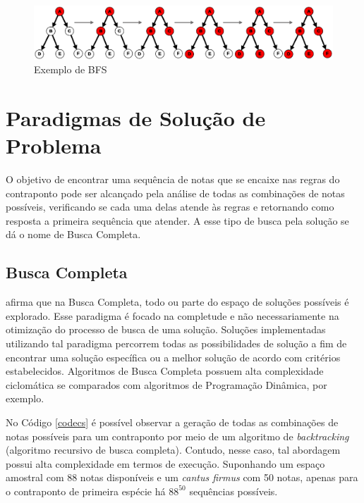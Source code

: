       \begin{figure}[htb]
        \centering
        \includegraphics[scale=0.2]{figuras/bfs.eps}
        \caption{Exemplo de BFS}
        \label{bfs}
      \end{figure}

  \section[Paradigmas de Solução de Problema]{Paradigmas de Solução de Problema}

    O objetivo de encontrar uma sequência de notas que se encaixe nas regras do contraponto pode ser alcançado pela análise de todas as combinações de notas possíveis, verificando se cada uma delas atende às regras e retornando como resposta a primeira sequência que atender. A esse tipo de busca pela solução se dá o nome de Busca Completa.

    \subsection[Busca Completa]{Busca Completa}

       afirma que na Busca Completa, todo ou parte do espaço de soluções possíveis é explorado. Esse paradigma é focado na completude e não necessariamente na otimização do processo de busca de uma solução. Soluções implementadas utilizando tal paradigma percorrem todas as possibilidades de solução a fim de encontrar uma solução específica ou a melhor solução de acordo com critérios estabelecidos. Algoritmos de Busca Completa possuem alta complexidade ciclomática se comparados com algoritmos de Programação Dinâmica, por exemplo.

      No Código \ref{codecs} é possível observar a geração de todas as combinações de notas possíveis para um contraponto por meio de um algoritmo de \textit{backtracking} (algoritmo recursivo de busca completa). Contudo, nesse caso, tal abordagem possui alta complexidade em termos de execução. Suponhando um espaço amostral com 88 notas disponíveis e um \textit{cantus firmus} com 50 notas, apenas para o contraponto de primeira espécie há $88^{50}$ sequências possíveis.

